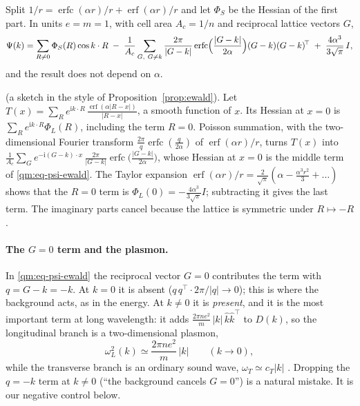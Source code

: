 \begin{proposition}\label{qm:prop-ewald}
Split $1/r=\operatorname{erfc}(\alpha r)/r+\operatorname{erf}(\alpha r)/r$ and let $\Phi_S$ be the Hessian of the
first part. In units $e=m=1$, with cell area $A_c=1/n$ and reciprocal lattice vectors $G$,
\begin{equation}\label{qm:eq-psi-ewald}
\Psi(k)=\sum_{R\ne0}\Phi_S(R)\cos k\cdot R\;-\;\frac1{A_c}\sum_{G,\ G\ne k}\frac{2\pi}{|G-k|}
\operatorname{erfc}\Bigl(\frac{|G-k|}{2\alpha}\Bigr)(G-k)(G-k)^{\!\top}\;+\;\frac{4\alpha^3}{3\sqrt\pi}\,I ,
\end{equation}
and the result does not depend on $\alpha$.
\end{proposition}
\begin{humanproof}
\tierC{} (a sketch in the style of Proposition~\ref{prop:ewald}). Let $T(x)=\sum_R e^{\mathrm ik\cdot R}\,
\frac{\operatorname{erf}(\alpha|R-x|)}{|R-x|}$, a smooth function of $x$. Its Hessian at $x=0$ is
$\sum_R e^{\mathrm ik\cdot R}\Phi_L(R)$, including the term $R=0$. Poisson summation, with the two-dimensional Fourier
transform $\frac{2\pi}{q}\operatorname{erfc}(\frac q{2\alpha})$ of $\operatorname{erf}(\alpha r)/r$, turns $T(x)$
into $\frac1{A_c}\sum_G e^{-\mathrm i(G-k)\cdot x}\,\frac{2\pi}{|G-k|}\operatorname{erfc}\bigl(\frac{|G-k|}{2\alpha}\bigr)$,
whose Hessian at $x=0$ is the middle term of \eqref{qm:eq-psi-ewald}. The Taylor expansion
$\operatorname{erf}(\alpha r)/r=\frac{2}{\sqrt\pi}(\alpha-\frac{\alpha^3r^2}3+\dots)$ shows that the $R=0$ term is
$\Phi_L(0)=-\frac{4\alpha^3}{3\sqrt\pi}I$; subtracting it gives the last term. The imaginary parts cancel because the
lattice is symmetric under $R\mapsto-R$.
\end{humanproof}

\paragraph{The $G=0$ term and the plasmon.} In \eqref{qm:eq-psi-ewald} the reciprocal vector $G=0$ contributes the
term with $q=G-k=-k$. At $k=0$ it is absent ($q\,q^\top\cdot 2\pi/|q|\to0$); this is where the background acts, as
in the energy. At $k\ne0$ it is \emph{present}, and it is the most important term at long wavelength: it adds
$\frac{2\pi n e^2}{m}\,|k|\,\hat k\hat k^\top$ to $D(k)$, so the longitudinal branch is a two-dimensional plasmon,
\begin{equation}\label{qm:eq-plasmon}
\omega_L^2(k)\simeq\frac{2\pi n e^2}{m}\,|k|\qquad(k\to0),
\end{equation}
while the transverse branch is an ordinary sound wave, $\omega_T\simeq c_T|k|$ \tierC. Dropping the $q=-k$ term at
$k\ne0$ (``the background cancels $G=0$'') is a natural mistake. It is our negative control below.

